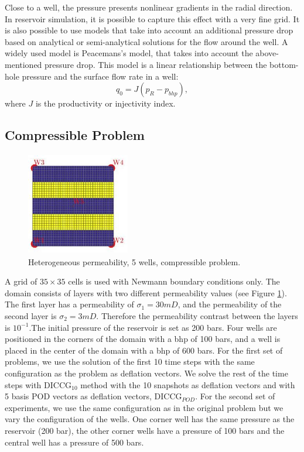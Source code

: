 \documentclass[12pt]{article}
\begin{document}
Close to a well, the pressure presents nonlinear gradients in the radial direction. In reservoir simulation, it is possible to capture this effect with a very fine grid. It is also possible to use models that take into account an additional pressure drop based on analytical or semi-analytical solutions for the flow around the well. A widely used model is Peacemans's model, that takes into account the above-mentioned pressure drop. 
This model is a linear relationship between the bottom-hole pressure and the surface flow rate in a well:
$$q_0=J(p_R-p_{bhp}),$$
where $J$ is the productivity or injectivity index.\\




\newpage
\subsection*{Compressible Problem}

\begin{figure}
\centering 
\vspace{-10pt}
\includegraphics[width=4.5cm,height=4.5cm,keepaspectratio]{perm_comp.jpg}
 \vspace{-5pt}
\caption{ Heterogeneous permeability, 5 wells, compressible problem.}\label{fig:pc}
\vspace{-15pt}
\end{figure} 

A grid of $35\times 35$ cells is used with Newmann boundary conditions only. The domain consists of layers with two different permeability values (see Figure \ref{fig:pc}). The first layer has a permeability of $\sigma_1 = 30mD$, and the permeability of the second layer is $\sigma_2 = 3mD$. Therefore the permeability contrast between the layers is $10^{-1}$.The initial pressure of the reservoir is set as 200 bars. Four wells are positioned in the corners of the domain with a bhp of 100 bars, and a well is placed in the center of the domain with a bhp of 600 bars.
 For the first set of problems, we use the solution of the first 10 time steps with the same configuration as the problem as deflation vectors. We solve the rest of the time steps with DICCG$_{10}$ method with the 10 snapshots as deflation vectors and with 5 basis POD vectors as deflation vectors, DICCG$_{POD}$.
 For the second set of experiments, we use the same configuration as in the original problem but we vary the configuration of the wells. One corner well has the same pressure as the reservoir (200 bar), the other corner wells have a pressure of 100 bars and the central well has a pressure of 500 bars. 
\end{document}

